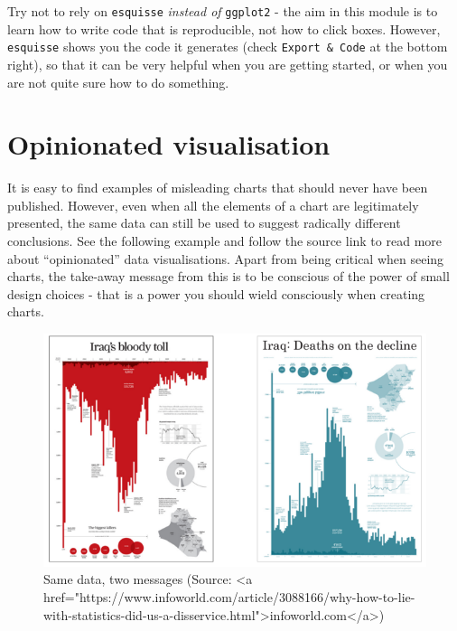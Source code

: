 \documentclass[
]{book}
\begin{document}
Try not to rely on \texttt{esquisse} \emph{instead of} \texttt{ggplot2} - the aim in this module is to learn how to write code that is reproducible, not how to click boxes. However, \texttt{esquisse} shows you the code it generates (check \texttt{Export\ \&\ Code} at the bottom right), so that it can be very helpful when you are getting started, or when you are not quite sure how to do something.

\hypertarget{opinionated-visualisation}{%
\section{Opinionated visualisation}\label{opinionated-visualisation}}

It is easy to find examples of misleading charts that should never have been published. However, even when all the elements of a chart are legitimately presented, the same data can still be used to suggest radically different conclusions. See the following example and follow the source link to read more about ``opinionated'' data visualisations. Apart from being critical when seeing charts, the take-away message from this is to be conscious of the power of small design choices - that is a power you should wield consciously when creating charts.

\begin{figure}

{\centering \includegraphics[width=1\linewidth]{./images/iraq-bloody-toll} 

}

\caption{Same data, two messages (Source: <a href="https://www.infoworld.com/article/3088166/why-how-to-lie-with-statistics-did-us-a-disservice.html">infoworld.com</a>)}\label{fig:two-messages}
\end{figure}
\end{document}
